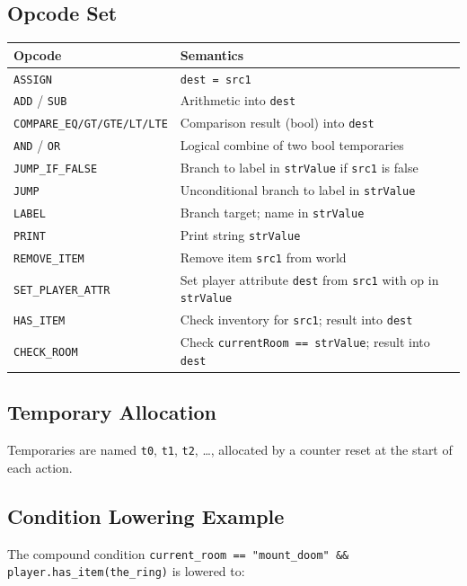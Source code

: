 \documentclass[12pt, a4paper]{article}
\begin{document}
\subsection{Opcode Set}

\begin{center}
\begin{tabular}{lp{9cm}}
\toprule
\textbf{Opcode} & \textbf{Semantics} \\
\midrule
\texttt{ASSIGN} & \texttt{dest = src1} \\
\texttt{ADD} / \texttt{SUB} & Arithmetic into \texttt{dest} \\
\texttt{COMPARE\_EQ/GT/GTE/LT/LTE} & Comparison result (bool) into \texttt{dest} \\
\texttt{AND} / \texttt{OR} & Logical combine of two bool temporaries \\
\texttt{JUMP\_IF\_FALSE} & Branch to label in \texttt{strValue} if \texttt{src1} is false \\
\texttt{JUMP} & Unconditional branch to label in \texttt{strValue} \\
\texttt{LABEL} & Branch target; name in \texttt{strValue} \\
\texttt{PRINT} & Print string \texttt{strValue} \\
\texttt{REMOVE\_ITEM} & Remove item \texttt{src1} from world \\
\texttt{SET\_PLAYER\_ATTR} & Set player attribute \texttt{dest} from \texttt{src1} with op in \texttt{strValue} \\
\texttt{HAS\_ITEM} & Check inventory for \texttt{src1}; result into \texttt{dest} \\
\texttt{CHECK\_ROOM} & Check \texttt{currentRoom == strValue}; result into \texttt{dest} \\
\bottomrule
\end{tabular}
\end{center}

\subsection{Temporary Allocation}
Temporaries are named \texttt{t0}, \texttt{t1}, \texttt{t2}, \ldots,
allocated by a counter reset at the start of each action.

\subsection{Condition Lowering Example}

The compound condition
\texttt{current\_room == "mount\_doom" \&\& player.has\_item(the\_ring)}
is lowered to:
\end{document}
